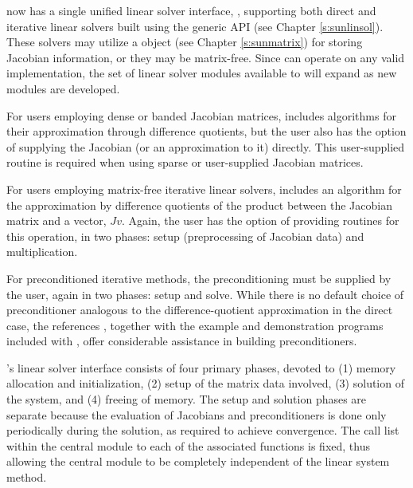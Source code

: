 {\kinsol} now has a single unified linear solver interface, {\kinls},
supporting both direct and iterative linear solvers built using the
generic {\sunlinsol} API (see Chapter \ref{s:sunlinsol}).  These
solvers may utilize a {\sunmatrix} object (see Chapter
\ref{s:sunmatrix}) for storing Jacobian information, or they may be
matrix-free. Since {\kinsol} can operate on any valid {\sunlinsol}
implementation, the set of linear solver modules available to
{\kinsol} will expand as new {\sunlinsol} modules are developed.

For users employing dense or banded Jacobian matrices, {\kinls}
includes algorithms for their approximation through difference
quotients, but the user also has the option of supplying the Jacobian
(or an approximation to it) directly.  This user-supplied
routine is required when using sparse or user-supplied Jacobian
matrices.

For users employing matrix-free iterative linear solvers, {\kinls}
includes an algorithm for the approximation by difference quotients of
the product between the Jacobian matrix and a vector, $Jv$. Again, the
user has the option of providing routines for this operation, in two
phases: setup (preprocessing of Jacobian data) and multiplication.

For preconditioned iterative methods, 
the preconditioning must be supplied by the user, again in two phases:
setup and solve.  While there is no
default choice of preconditioner analogous to the difference-quotient
approximation in the direct case, the references
\cite{BrHi:89,Byr:92}, together with the example and demonstration
programs included with {\kinsol}, offer considerable assistance in
building preconditioners.

{\kinsol}'s linear solver interface consists of four primary phases,
devoted to (1) memory allocation and initialization, (2) setup of the
matrix data involved, (3) solution of the system, and (4) freeing of memory.
The setup and solution phases are separate because the evaluation of
Jacobians and preconditioners is done only periodically during the
solution, as required to achieve convergence. The call list within
the central {\kinsol} module to each of the associated functions is
fixed, thus allowing the central module to be completely independent
of the linear system method.

